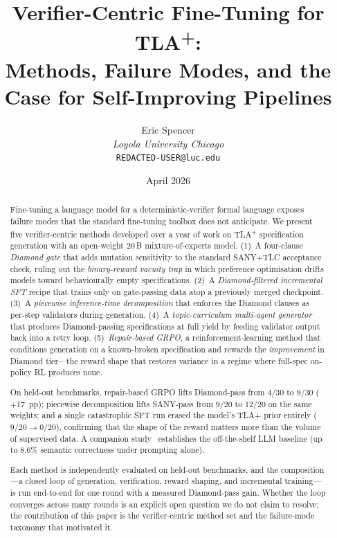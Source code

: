 \documentclass[11pt]{article}
\title{Verifier-Centric Fine-Tuning for TLA\textsuperscript{+}:\\
Methods, Failure Modes, and the Case for Self-Improving Pipelines}
\author{Eric Spencer\\
\small \textit{Loyola University Chicago}\\
\small \texttt{REDACTED-USER@luc.edu}}
\date{April 2026}
\begin{document}
\maketitle

\begin{abstract}
Fine-tuning a language model for a deterministic-verifier formal language
exposes failure modes that the standard fine-tuning toolbox does not
anticipate.  We present five verifier-centric methods developed over a
year of work on TLA\textsuperscript{+} specification generation with an
open-weight 20\,B mixture-of-experts model.
(1)~A four-clause \emph{Diamond gate} that adds mutation sensitivity to
the standard SANY+TLC acceptance check, ruling out the
\emph{binary-reward vacuity trap} in which preference optimisation drifts
models toward behaviourally empty specifications.
(2)~A \emph{Diamond-filtered incremental SFT} recipe that trains only on
gate-passing data atop a previously merged checkpoint.
(3)~A \emph{piecewise inference-time decomposition} that enforces the
Diamond clauses as per-step validators during generation.
(4)~A \emph{topic-curriculum multi-agent generator} that produces
Diamond-passing specifications at full yield by feeding validator output
back into a retry loop.
(5)~\emph{Repair-based GRPO}, a reinforcement-learning method that
conditions generation on a known-broken specification and rewards the
\emph{improvement} in Diamond tier---the reward shape that restores
variance in a regime where full-spec on-policy RL produces none.

On held-out benchmarks, repair-based GRPO lifts Diamond-pass from $4/30$
to $9/30$ ($+17$~pp); piecewise decomposition lifts SANY-pass from
$9/20$ to $12/20$ on the same weights; and a single catastrophic SFT run
erased the model's TLA+ prior entirely ($9/20 \to 0/20$), confirming that
the shape of the reward matters more than the volume of supervised data.
A companion study~\cite{ortiz2026formallm} establishes the off-the-shelf
LLM baseline (up to 8.6\% semantic correctness under prompting alone).

Each method is independently evaluated on held-out benchmarks, and the
composition---a closed loop of generation, verification, reward
shaping, and incremental training---is run end-to-end for one round
with a measured Diamond-pass gain.  Whether the loop converges across
many rounds is an explicit open question we do not claim to resolve;
the contribution of this paper is the verifier-centric method set and
the failure-mode taxonomy that motivated it.
\end{abstract}
\end{document}

